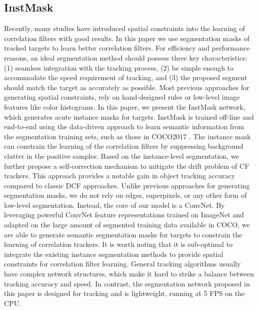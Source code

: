 \documentclass[review]{elsarticle}
\begin{document}
\begin{CJK*}{UTF8}{gbsn}
\subsection{InstMask}
Recently, many studies \cite{Danelljan2015LearningSR, Lukezic2017DiscriminativeCF, Galoogahi2017LearningBC, Xu2018LearningAD, Feng2018LearningSR} have introduced spatial constraints into the learning of correlation filters with good results. In this paper we use segmentation masks of tracked targets to learn better correlation filters. For efficiency and performance reasons, an ideal segmentation method should possess three key characteristics: (1) seamless integration with the tracking process, (2) be simple enough to accommodate the speed requirement of tracking, and (3) the proposed segment should match the target as accurately as possible.
Most previous approaches for generating spatial constraints, rely on hand-designed rules or low-level image features like color histograms.
In this paper, we present the InstMask network, which generates acute instance masks for targets. InstMask is trained off-line and end-to-end using the data-driven approach to learn semantic information from the segmentation training sets, such as those in COCO2017 \cite{Lin2014MicrosoftCC}. The instance mask can constrain the learning of the correlation filters by suppressing background clutter in the positive samples. Based on the instance-level segmentation, we further propose a self-correction mechanism to mitigate the drift problem of CF trackers. This approach provides a notable gain in object tracking accuracy compared to classic DCF approaches.
Unlike previous approaches for generating segmentation masks, we do not rely on edges, superpixels, or any other form of low-level segmentation. Instead, the core of our model is a ConvNet. By leveraging powerful ConvNet feature representations trained on ImageNet and adapted on the large amount of segmented training data available in COCO, we are able to generate semantic segmentation masks for targets to constrain the learning of correlation trackers.
It is worth noting that it is sub-optimal to integrate the existing instance segmentation methods to provide spatial constraints for correlation filter learning. General tracking algorithms usually have complex network structures, which make it hard to strike a balance between tracking accuracy and speed. In contrast, the segmentation network proposed in this paper is designed for tracking and is lightweight, running at 5 FPS on the CPU.


\end{CJK*}
\end{document}
